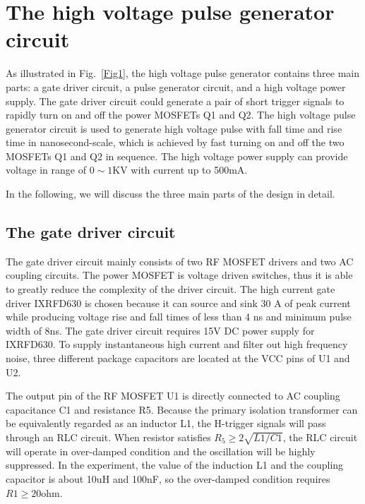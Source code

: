 \documentclass[aip,rsi,reprint,graphicx]{revtex4-1} %
\begin{document}
\section{The high voltage pulse generator circuit}
As illustrated in Fig.~\ref{Fig1}, the high voltage pulse generator contains three main parts: a gate driver circuit, a pulse generator circuit, and a high voltage power supply. The gate driver circuit could generate a pair of short trigger signals to rapidly turn on and off the power MOSFETs Q1 and Q2. The high voltage pulse generator circuit is used to generate high voltage pulse with fall time and rise time in nanosecond-scale, which is achieved by fast turning on and off the two MOSFETs Q1 and Q2 in sequence. The high voltage power supply can provide voltage in range of $0\sim1$KV with current up to 500mA.


In the following, we will discuss the three main parts of the design in detail.

\subsection{The gate driver circuit}
The gate driver circuit mainly consists of two RF MOSFET drivers and two AC coupling circuits.
 The power MOSFET is voltage driven switches, thus it is able to greatly reduce the complexity of the driver circuit.
 The high current gate driver IXRFD630 is chosen because it can source and sink 30 A of peak current while producing voltage rise and fall times of less than 4 ns and minimum pulse width of 8ns.
 The gate driver circuit requires 15V DC power supply for IXRFD630.
 To supply instantaneous high current and filter out high frequency noise, three different package capacitors are located at the VCC pins of U1 and U2.
\begin{figure*}
\caption{Schematic diagram of high voltage generator circuit.\label{Fig1}}%
\end{figure*}

	The output pin of the RF MOSFET U1 is directly connected to AC coupling capacitance C1 and resistance R5. Because the primary isolation transformer can be equivalently regarded as an inductor L1, the H-trigger signals will pass through an RLC circuit. When resistor satisfies $R_5\ge 2\sqrt{L1/C1}$, the RLC circuit will operate in over-damped condition and the oscillation will be highly suppressed. In the experiment, the value of the induction L1 and the coupling capacitor is about 10uH and 100nF, so the over-damped condition requires $R1\ge20$ohm.
\end{document}
